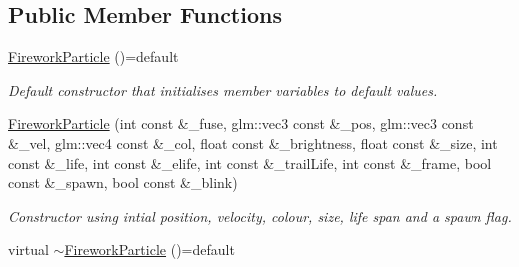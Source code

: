 \subsection*{Public Member Functions}
\begin{DoxyCompactItemize}
\item 
\hypertarget{classFireworkParticle_a8900c1a99a0442e56dbff7153e967056}{\hyperlink{classFireworkParticle_a8900c1a99a0442e56dbff7153e967056}{Firework\-Particle} ()=default}\label{classFireworkParticle_a8900c1a99a0442e56dbff7153e967056}

\begin{DoxyCompactList}\small\item\em Default constructor that initialises member variables to default values. \end{DoxyCompactList}\item 
\hyperlink{classFireworkParticle_aa9833cf5c42acc247b734dbeb8125bc3}{Firework\-Particle} (int const \&\-\_\-fuse, glm\-::vec3 const \&\-\_\-pos, glm\-::vec3 const \&\-\_\-vel, glm\-::vec4 const \&\-\_\-col, float const \&\-\_\-brightness, float const \&\-\_\-size, int const \&\-\_\-life, int const \&\-\_\-elife, int const \&\-\_\-trail\-Life, int const \&\-\_\-frame, bool const \&\-\_\-spawn, bool const \&\-\_\-blink)
\begin{DoxyCompactList}\small\item\em Constructor using intial position, velocity, colour, size, life span and a spawn flag. \end{DoxyCompactList}\item 
\hypertarget{classFireworkParticle_a2093ec748627554a4e8b68663d4b2245}{virtual \hyperlink{classFireworkParticle_a2093ec748627554a4e8b68663d4b2245}{$\sim$\-Firework\-Particle} ()=default}\label{classFireworkParticle_a2093ec748627554a4e8b68663d4b2245}


\end{DoxyCompactItemize}
